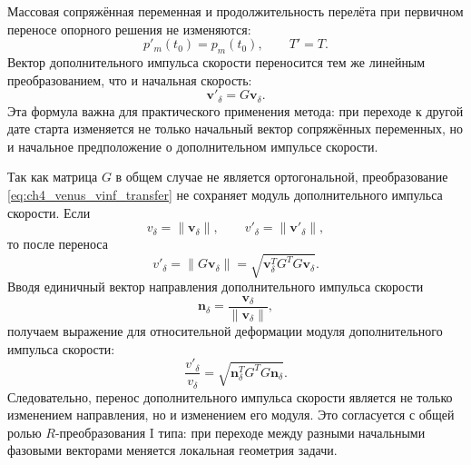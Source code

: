 Массовая сопряжённая переменная и продолжительность перелёта при первичном переносе опорного решения не изменяются:
\begin{equation}
	p'_m(t_0)=p_m(t_0),
	\qquad
	T'=T .
	\label{eq:ch4_venus_pm_T_transfer}
\end{equation}
Вектор дополнительного импульса скорости переносится тем же линейным преобразованием, что и начальная скорость:
\begin{equation}
	\mathbf v'_\delta
	=
	G\mathbf v_\delta .
	\label{eq:ch4_venus_vinf_transfer}
\end{equation}
Эта формула важна для практического применения метода: при переходе к другой дате старта изменяется не только начальный вектор сопряжённых переменных, но и начальное предположение о дополнительном импульсе скорости.

Так как матрица \(G\) в общем случае не является ортогональной, преобразование \eqref{eq:ch4_venus_vinf_transfer} не сохраняет модуль дополнительного импульса скорости. Если
\begin{equation}
	v_\delta=\|\mathbf v_\delta\|,
	\qquad
	v'_\delta=\|\mathbf v'_\delta\|,
\end{equation}
то после переноса
\begin{equation}
	v'_\delta
	=
	\|G\mathbf v_\delta\|
	=
	\sqrt{
		\mathbf v_\delta^T
		G^T G
		\mathbf v_\delta
	}.
	\label{eq:ch4_venus_vinf_norm_deformation}
\end{equation}
Вводя единичный вектор направления дополнительного импульса скорости
\begin{equation}
	\mathbf n_\delta
	=
	\frac{\mathbf v_\delta}{\|\mathbf v_\delta\|},
\end{equation}
получаем выражение для относительной деформации модуля дополнительного импульса скорости:
\begin{equation}
	\frac{v'_\delta}{v_\delta}
	=
	\sqrt{
		\mathbf n_\delta^T
		G^T G
		\mathbf n_\delta
	}.
	\label{eq:ch4_venus_vinf_relative_deformation}
\end{equation}
Следовательно, перенос дополнительного импульса скорости является не только изменением направления, но и изменением его модуля. Это согласуется с общей ролью \(R\)-преобразования I типа: при переходе между разными начальными фазовыми векторами меняется локальная геометрия задачи.

